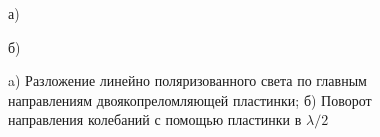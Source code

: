 \documentclass[a4paper,12pt]{article} %
\begin{document}
	
	\begin{figure}[h!]
		\begin{minipage}[h!]{0.49\linewidth}
			 {а)}
		\end{minipage}
		\hfill
		\begin{minipage}[h!]{0.49\linewidth}
			 {б)}
		\end{minipage}
		\caption{a) Разложение линейно поляризованного света по главным направлениям двоякопреломляющей пластинки; б) Поворот направления колебаний с помощью пластинки в $\lambda/2$}
	\end{figure}	
		
\end{document}
